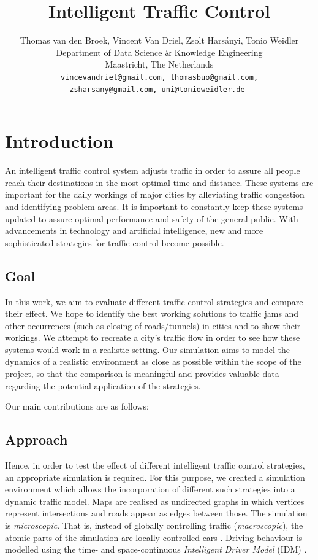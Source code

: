 \documentclass[10pt]{article}
\title{Intelligent Traffic Control}
\author{Thomas van den Broek, Vincent Van Driel, Zsolt Harsányi, Tonio Weidler\\
	Department of Data Science \& Knowledge Engineering\\
	Maastricht, The Netherlands\\
	\tt \small vincevandriel@gmail.com, thomasbuo@gmail.com,\\
	\tt \small zsharsany@gmail.com, uni@tonioweidler.de
}
\begin{document}
\maketitle
\begin{abstract}
\end{abstract}

\section{Introduction}
An intelligent traffic control system adjusts traffic in order to assure all people reach their destinations in the most optimal time and distance. These systems are important for the daily workings of major cities by alleviating traffic congestion and identifying problem areas.  It is important to constantly keep these systems updated to assure optimal performance and safety of the general public. With advancements in technology and artificial intelligence, new and more sophisticated strategies for traffic control become possible.

\subsection{Goal}
In this work, we aim to evaluate different traffic control strategies and compare their effect. We hope to identify the best working solutions to traffic jams and other occurrences (such as closing of roads/tunnels) in cities and to show their workings. We attempt to recreate a city's traffic flow in order to see how these systems would work in a realistic setting. Our simulation aims to model the dynamics of a realistic environment as close as possible within the scope of the project, so that the comparison is meaningful and provides valuable data regarding the potential application of the strategies.

Our main contributions are as follows:

\subsection{Approach}
Hence, in order to test the effect of different intelligent traffic control strategies, an appropriate simulation is required. For this purpose, we created a simulation environment which allows the incorporation of different such strategies into a dynamic traffic model. Maps are realised as undirected graphs in which vertices represent intersections and roads appear as edges between those. The simulation is \textit{microscopic}. That is, instead of globally controlling traffic (\textit{macroscopic}), the atomic parts of the simulation are locally controlled cars \citep[see also][]{krajzewicz2002sumo}. Driving behaviour is modelled using the time- and space-continuous \textit{Intelligent Driver Model} (IDM) \citep{treiber2000congested}. 
\end{document}
